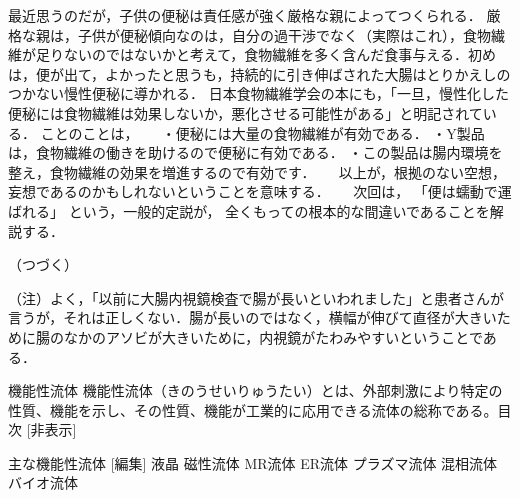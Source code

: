 最近思うのだが，子供の便秘は責任感が強く厳格な親によってつくられる．
厳格な親は，子供が便秘傾向なのは，自分の過干渉でなく（実際はこれ），食物繊維が足りないのではないかと考えて，食物繊維を多く含んだ食事与える．初めは，便が出て，よかったと思うも，持続的に引き伸ばされた大腸はとりかえしのつかない慢性便秘に導かれる．
日本食物繊維学会の本にも，「一旦，慢性化した便秘には食物繊維は効果しないか，悪化させる可能性がある」と明記されている．
ことのことは，
　
・便秘には大量の食物繊維が有効である．
・Y製品は，食物繊維の働きを助けるので便秘に有効である．
・この製品は腸内環境を整え，食物繊維の効果を増進するので有効です．
　
以上が，根拠のない空想，妄想であるのかもしれないということを意味する．
　
次回は， 
「便は蠕動で運ばれる」
という，一般的定説が，
全くもっての根本的な間違いであることを解説する． 

（つづく）

（注）よく，「以前に大腸内視鏡検査で腸が長いといわれました」と患者さんが言うが，それは正しくない．腸が長いのではなく，横幅が伸びて直径が大きいために腸のなかのアソビが大きいために，内視鏡がたわみやすいということである．



機能性流体
機能性流体（きのうせいりゅうたい）とは、外部刺激により特定の性質、機能を示し、その性質、機能が工業的に応用できる流体の総称である。目次  [非表示] 

主な機能性流体 [編集]
液晶
磁性流体
MR流体
ER流体
プラズマ流体
混相流体
バイオ流体

